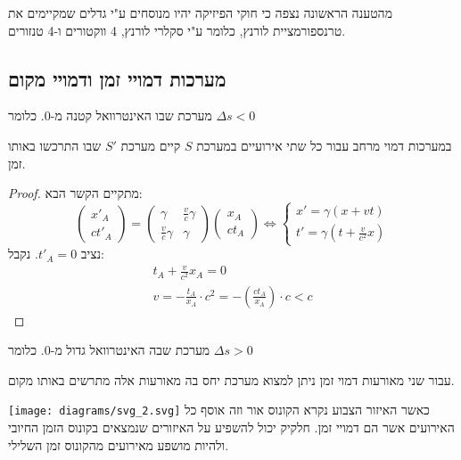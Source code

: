 \documentclass{tstextbook}
\begin{document}
\begin{proposition}
מהטענה הראשונה נצפה כי חוקי הפיזיקה יהיו מנוסחים ע"י גדלים שמקיימים את טרנספורמציית לורנץ, כלומר ע"י סקלרי לורנץ, 4 ווקטורים ו-4 טנזורים.

\end{proposition}
\subsection{מערכות דמויי זמן ודמויי מקום}

\begin{definition}
מערכת שבו האינטרוואל קטנה מ-0. כלומר \(\Delta s<0\)

\end{definition}
\begin{proposition}
במערכות דמוי מרחב עבור כל שתי אירועיים במערכת \(S\) קיים מערכת \(S'\) שבו התרכשו באותו זמן.

\end{proposition}
\begin{proof}
מתקיים הקשר הבא:
$$\begin{pmatrix}x'_{A} \\ct'_{A} \end{pmatrix}=\begin{pmatrix}\gamma & \frac{v}{c}\gamma \\\frac{v}{c}\gamma & \gamma\end{pmatrix}\begin{pmatrix}x_{A}  \\ct_{A}\end{pmatrix}\iff \begin{cases}x'=\gamma(x+vt) \\t'=\gamma\left( t+\frac{v}{c^2}x \right)
\end{cases}$$
נציב \(t'_{A}=0\). נקבל:
$$\begin{gather}t_{A}+\frac{v}{c^2}x_{A}=0 \\v=-\frac{t_{A}}{x_{A}}\cdot c^2 = - \left( \frac{ct_{A}}{x_{A}} \right)\cdot c <c
\end{gather}$$

\end{proof}
\begin{definition}
מערכת שבה האינטרוואל גדול מ-0. כלומר \(\Delta s>0\)

\end{definition}
\begin{proposition}
עבור שני מאורעות דמוי זמן ניתן למצוא מערכת יחס בה מאורעות אלה מתרשים באותו מקום. 

\end{proposition}
\texttt{[image: diagrams/svg\_2.svg]}
כאשר האיזור הצבוע נקרא הקונוס אור וזה אוסף כל האירועים אשר הם דמויי זמן. חלקיק יכול להשפיע על האיזורים שנמצאים בקונוס הזמן החיובי ולהיות מושפע מאירועים מהקונוס זמן השלילי.
\end{document}
